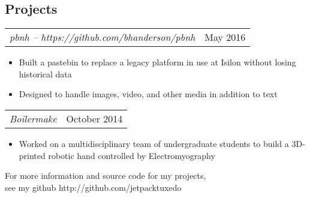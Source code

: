 \documentclass[line,margin]{res}
\newenvironment{tightcenter}{%
  \setlength\topsep{0pt}
  \setlength\parskip{0pt}
  \begin{center}
  }{\end{center}}
\begin{document}
\begin{resume}
  \section{\textcolor{TealBlue}{Projects}}
    \begin{tabular}{@{} p{} l @{}}
      {\sl pbnh -- https://github.com/bhanderson/pbnh\/} & May 2016 %
    \end{tabular}
      \begin{itemize}
	\setlength{\itemsep}{-2pt}
        \item Built a pastebin to replace a legacy platform in use at Isilon without losing historical data
        \item Designed to handle images, video, and other media in addition to text
      \end{itemize}

    \begin{tabular}{@{} p{} l @{}}
      {\sl Boilermake\/} & October 2014
    \end{tabular}
      \begin{itemize}
	\setlength{\itemsep}{-2pt}
        \item Worked on a multidisciplinary team of undergraduate students to build a 3D-printed robotic hand controlled by Electromyography
      \end{itemize}

\end{resume}

\vfill
\begin{tightcenter}
For more information and source code for my projects,\\
see my github http://github.com/jetpacktuxedo
\end{tightcenter}
\end{document}
